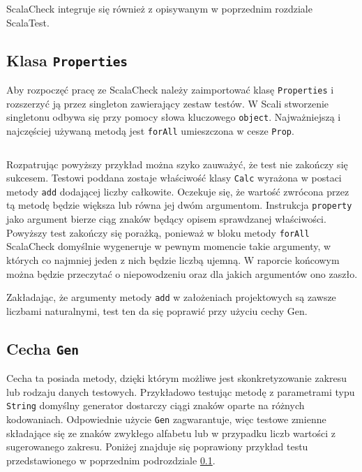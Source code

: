 \documentclass[brudnopis]{xmgr}
\begin{document}
ScalaCheck integruje się również z opisywanym w poprzednim rozdziale ScalaTest.

\subsection{Klasa \texttt{Properties}}

\label{scalaCheck:properties}

Aby rozpoczęć pracę ze ScalaCheck należy zaimportować klasę \texttt{Properties} i rozszerzyć ją przez singleton zawierający zestaw testów. W Scali stworzenie singletonu odbywa się przy pomocy słowa kluczowego \texttt{object}. Najważniejszą i najczęściej używaną metodą jest \texttt{forAll} umieszczona w cesze \texttt{Prop}.

\inputminted[fontsize=\small]{scala}{code/CalcTestBad.scala}

Rozpatrując powyższy przykład można szyko zauważyć, że test nie zakończy się sukcesem. Testowi poddana zostaje właściwość klasy \texttt{Calc} wyrażona w postaci metody \texttt{add} dodającej liczby całkowite. Oczekuje się, że wartość zwrócona przez tą metodę będzie większa lub równa jej dwóm argumentom. Instrukcja \texttt{property} jako argument bierze ciąg znaków będący opisem sprawdzanej właściwości. Powyższy test zakończy się porażką, ponieważ w bloku metody \texttt{forAll} ScalaCheck domyślnie wygeneruje w pewnym momencie takie argumenty, w których co najmniej jeden z nich będzie liczbą ujemną. W raporcie końcowym można będzie przeczytać o niepowodzeniu oraz dla jakich argumentów ono zaszło.

Zakładając, że argumenty metody \texttt{add} w założeniach projektowych są zawsze liczbami naturalnymi, test ten da się poprawić przy użyciu cechy Gen.

\subsection{Cecha \texttt{Gen}} 

Cecha ta posiada metody, dzięki którym możliwe jest skonkretyzowanie zakresu lub rodzaju danych testowych. Przykładowo testując metodę z parametrami typu \texttt{String} domyślny generator dostarczy ciągi znaków oparte na różnych kodowaniach. Odpowiednie użycie \texttt{Gen} zagwarantuje, więc testowe zmienne składające się ze znaków zwykłego alfabetu lub w przypadku liczb wartości z sugerowanego zakresu. Poniżej znajduje się poprawiony przykład testu przedstawionego w poprzednim podrozdziale \ref{scalaCheck:properties}.
\end{document}
